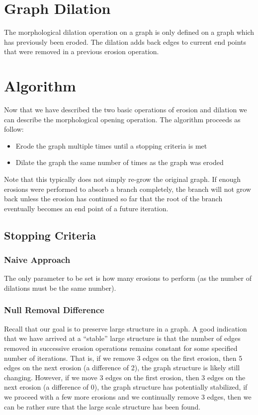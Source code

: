 \documentclass{InsightArticle}
\begin{document}
\section{Graph Dilation}
The morphological dilation operation on a graph is only defined on a graph which has previously been eroded. The dilation adds back edges to current end points that were removed in a previous erosion operation.

\section{Algorithm}
\label{sec:Algorithm}
Now that we have described the two basic operations of erosion and dilation we can describe the morphological opening operation. The algorithm proceeds as follow:
\begin{itemize}
 \item Erode the graph multiple times until a stopping criteria is met
 \item Dilate the graph the same number of times as the graph was eroded
\end{itemize}

Note that this typically does not simply re-grow the original graph. If enough erosions were performed to absorb a branch completely, the branch will not grow back unless the erosion has continued so far that the root of the branch eventually becomes an end point of a future iteration.

\subsection{Stopping Criteria}
\subsubsection{Naive Approach}
The only parameter to be set is how many erosions to perform (as the number of dilations must be the same number).
\subsubsection{Null Removal Difference}
Recall that our goal is to preserve large structure in a graph. A good indication that we have arrived at a ``stable'' large structure is that the number of edges removed in successive erosion operations remains constant for some specified number of iterations. That is, if we remove 3 edges on the first erosion, then 5 edges on the next erosion (a difference of 2), the graph structure is likely still changing. However, if we move 3 edges on the first erosion, then 3 edges on the next erosion (a difference of 0), the graph structure has potentially stabilized, if we proceed with a few more erosions and we continually remove 3 edges, then we can be rather sure that the large scale structure has been found.
\end{document}
